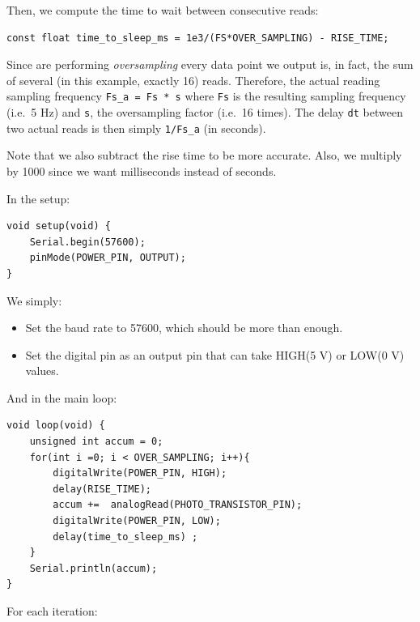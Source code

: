 \documentclass[]{article}
\begin{document}
Then, we compute the time to wait between consecutive reads:

\begin{verbatim}
const float time_to_sleep_ms = 1e3/(FS*OVER_SAMPLING) - RISE_TIME;
\end{verbatim}

Since are performing \emph{oversampling} every data point we output is,
in fact, the sum of several (in this example, exactly 16) reads.
Therefore, the actual reading sampling frequency
\texttt{Fs\_a\ =\ Fs\ *\ s} where \texttt{Fs} is the resulting sampling
frequency (i.e.~5 Hz) and \texttt{s}, the oversampling factor (i.e.~16
times). The delay \texttt{dt} between two actual reads is then simply
\texttt{1/Fs\_a} (in seconds).

Note that we also subtract the rise time to be more accurate. Also, we
multiply by 1000 since we want milliseconds instead of seconds.

In the setup:

\begin{verbatim}
void setup(void) {
    Serial.begin(57600);
    pinMode(POWER_PIN, OUTPUT);
}
\end{verbatim}

We simply:

\begin{itemize}
\itemsep1pt\parskip0pt
\item
  Set the baud rate to 57600, which should be more than enough.
\item
  Set the digital pin as an output pin that can take HIGH(5 V) or LOW(0
  V) values.
\end{itemize}

And in the main loop:

\begin{verbatim}
void loop(void) {
    unsigned int accum = 0;
    for(int i =0; i < OVER_SAMPLING; i++){
        digitalWrite(POWER_PIN, HIGH);
        delay(RISE_TIME);
        accum +=  analogRead(PHOTO_TRANSISTOR_PIN);
        digitalWrite(POWER_PIN, LOW);
        delay(time_to_sleep_ms) ;
    }
    Serial.println(accum);
}
\end{verbatim}

For each iteration:
\end{document}
